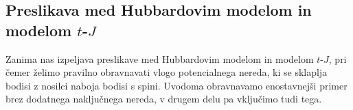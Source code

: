 \cleardoublepage{}
{}




\cleardoublepage
\renewcommand\appendixname{Dodatek}
\begin{appendices}

\chapter{Preslikava med Hubbardovim modelom in modelom $t$-$J$}
\label{tj_hubb_preslikava}
Zanima nas izpeljava preslikave med Hubbardovim modelom in modelom $t$-$J$, pri čemer želimo pravilno obravnavati vlogo potencialnega nereda, ki se sklaplja bodisi z nosilci naboja bodisi s spini. Uvodoma obravnavamo enostavnejši primer brez dodatnega naključnega nereda, v drugem delu pa vključimo tudi tega. 

\end{appendices}
